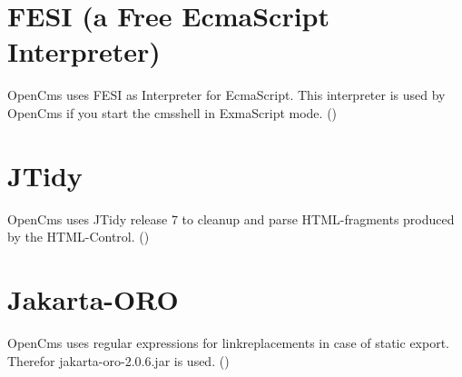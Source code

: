 \section{FESI (a Free EcmaScript Interpreter)}
OpenCms uses FESI as Interpreter for EcmaScript. This interpreter is used by OpenCms if you start the cmsshell in
ExmaScript mode.
()

\section{JTidy}
OpenCms uses JTidy release 7 to cleanup and parse HTML-fragments produced by the HTML-Control. 
()

\section{Jakarta-ORO}
OpenCms uses regular expressions for linkreplacements in case of static export. Therefor jakarta-oro-2.0.6.jar
is used.
()
